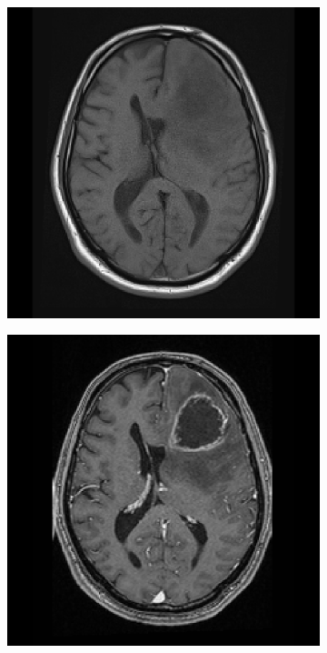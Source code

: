 \begin{figure}[hbt]
    \centering
    \begin{subfigure}[b]{0.45\textwidth}
        \centering
        \includegraphics[width=\textwidth]{Figures/T1.png}
        \caption{}\label{fig:intro_T1}
    \end{subfigure}
    \begin{subfigure}[b]{0.45\textwidth}
        \centering
        \includegraphics[width=\textwidth]{Figures/T1GD.png}
        \caption{}\label{fig:intro_T1GD}
    \end{subfigure}


\end{figure}
